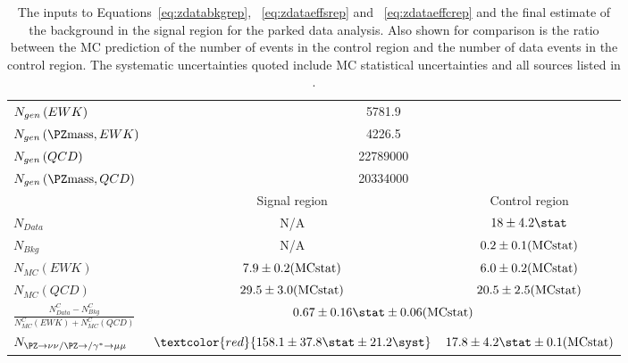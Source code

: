 \begin{table}
  \caption{The inputs to Equations~\ref{eq:zdatabkgrep}, ~\ref{eq:zdataeffsrep} and ~\ref{eq:zdataeffcrep} and the final estimate of the \Znunu background in the signal region for the parked data analysis. Also shown for comparison is the ratio between the \ac{MC} prediction of the number of \Zmumu events in the control region and the number of data events in the control region. The systematic uncertainties quoted include MC statistical uncertainties and all sources listed in . }
  \label{tab:parkedznunu}
  \begin{tabular}{lcc}
    \hline
    \hline
    $N_{gen}\left(\mathnormal{EWK}\right)$&\multicolumn{2}{c}{5781.9}\\
    $N_{gen}\left(\PZ\rm{mass},\mathnormal{EWK}\right)$&\multicolumn{2}{c}{4226.5}\\
    $N_{gen}\left(\mathnormal{QCD}\right)$&\multicolumn{2}{c}{22789000}\\
    $N_{gen}\left(\PZ\rm{mass},\mathnormal{QCD}\right)$&\multicolumn{2}{c}{20334000}\\
    \hline
    \hline
    & Signal region & Control region \\
    \hline
    \hline
    $N_{Data}$ & N/A & $18\pm 4.2\stat$ \\
    $N_{Bkg}$ & N/A & $0.2\pm 0.1 (\rm{MC stat})$ \\
    $N_{MC}\left(EWK\right)$ & $7.9\pm 0.2 (\rm{MC stat})$& $6.0\pm 0.2 (\rm{MC stat})$ \\
    $N_{MC}\left(QCD\right)$ & $29.5\pm 3.0 (\rm{MC stat})$ & $20.5\pm 2.5 (\rm{MC stat})$ \\
    \hline
    $\frac{N^{C}_{Data}-N^{C}_{Bkg}}{N^{C}_{MC}\left(EWK\right)+N^{C}_{MC}\left(QCD\right)}$ & \multicolumn{2}{c}{$0.67\pm 0.16\stat\pm 0.06 (\rm{MC stat})$} \\
    \hline
    $N_{\PZ\rightarrow \nu\nu/\PZ\rightarrow/\gamma^{*}\rightarrow\mu\mu}$ & $\textcolor{red}{158.1\pm 37.8\stat\pm 21.2\syst}$ & $17.8\pm 4.2\stat\pm 0.1 (\rm{MC stat})$ \\
    \hline
    \hline
  \end{tabular}
\end{table}

